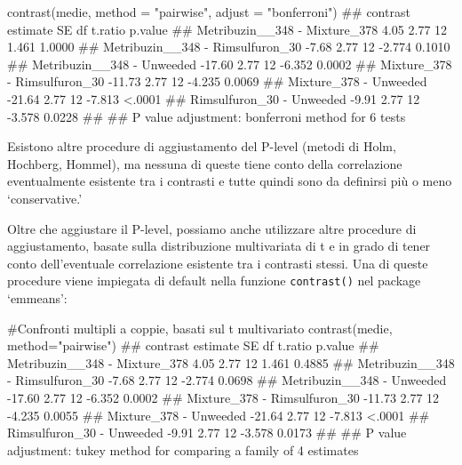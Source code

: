 \documentclass[a4paper,12pt,oneside]{book}
\newenvironment{Shaded}{\begin{snugshade}}{\end{snugshade}}
\newcommand{\StringTok}[1]{#1}
\newcommand{\CommentTok}[1]{#1}
\newcommand{\DocumentationTok}[1]{#1}
\newcommand{\FunctionTok}[1]{#1}
\newcommand{\AttributeTok}[1]{#1}
\newcommand{\NormalTok}[1]{#1}
\begin{document}
\begin{Shaded}
\begin{Highlighting}[]
\FunctionTok{contrast}\NormalTok{(medie, }\AttributeTok{method =} \StringTok{"pairwise"}\NormalTok{, }\AttributeTok{adjust =} \StringTok{"bonferroni"}\NormalTok{)}
\DocumentationTok{\#\#  contrast                         estimate   SE df t.ratio p.value}
\DocumentationTok{\#\#  Metribuzin\_\_348 {-} Mixture\_378        4.05 2.77 12   1.461  1.0000}
\DocumentationTok{\#\#  Metribuzin\_\_348 {-} Rimsulfuron\_30    {-}7.68 2.77 12  {-}2.774  0.1010}
\DocumentationTok{\#\#  Metribuzin\_\_348 {-} Unweeded         {-}17.60 2.77 12  {-}6.352  0.0002}
\DocumentationTok{\#\#  Mixture\_378 {-} Rimsulfuron\_30       {-}11.73 2.77 12  {-}4.235  0.0069}
\DocumentationTok{\#\#  Mixture\_378 {-} Unweeded             {-}21.64 2.77 12  {-}7.813  \textless{}.0001}
\DocumentationTok{\#\#  Rimsulfuron\_30 {-} Unweeded           {-}9.91 2.77 12  {-}3.578  0.0228}
\DocumentationTok{\#\# }
\DocumentationTok{\#\# P value adjustment: bonferroni method for 6 tests}
\end{Highlighting}
\end{Shaded}

Esistono altre procedure di aggiustamento del P-level (metodi di Holm, Hochberg, Hommel), ma nessuna di queste tiene conto della correlazione eventualmente esistente tra i contrasti e tutte quindi sono da definirsi più o meno `conservative.'

Oltre che aggiustare il P-level, possiamo anche utilizzare altre procedure di aggiustamento, basate sulla distribuzione multivariata di t e in grado di tener conto dell'eventuale correlazione esistente tra i contrasti stessi. Una di queste procedure viene impiegata di default nella funzione \texttt{contrast()} nel package `emmeans':

\small

\begin{Shaded}
\begin{Highlighting}[]
\CommentTok{\#Confronti multipli a coppie, basati sul t multivariato}
\FunctionTok{contrast}\NormalTok{(medie, }\AttributeTok{method=}\StringTok{"pairwise"}\NormalTok{)}
\DocumentationTok{\#\#  contrast                         estimate   SE df t.ratio p.value}
\DocumentationTok{\#\#  Metribuzin\_\_348 {-} Mixture\_378        4.05 2.77 12   1.461  0.4885}
\DocumentationTok{\#\#  Metribuzin\_\_348 {-} Rimsulfuron\_30    {-}7.68 2.77 12  {-}2.774  0.0698}
\DocumentationTok{\#\#  Metribuzin\_\_348 {-} Unweeded         {-}17.60 2.77 12  {-}6.352  0.0002}
\DocumentationTok{\#\#  Mixture\_378 {-} Rimsulfuron\_30       {-}11.73 2.77 12  {-}4.235  0.0055}
\DocumentationTok{\#\#  Mixture\_378 {-} Unweeded             {-}21.64 2.77 12  {-}7.813  \textless{}.0001}
\DocumentationTok{\#\#  Rimsulfuron\_30 {-} Unweeded           {-}9.91 2.77 12  {-}3.578  0.0173}
\DocumentationTok{\#\# }
\DocumentationTok{\#\# P value adjustment: tukey method for comparing a family of 4 estimates}
\end{Highlighting}
\end{Shaded}
\end{document}
